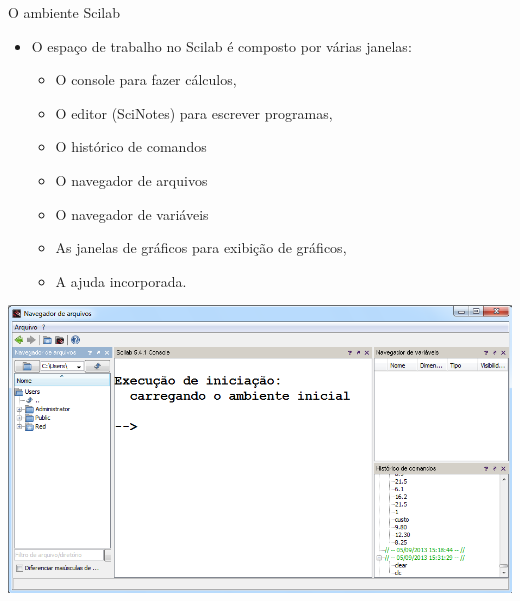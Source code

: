 \begin{frame}[allowframebreaks]{O ambiente Scilab}
  \begin{itemize}
    \item O \alert{espaço de trabalho} no Scilab é composto por várias
    janelas:
    \begin{itemize}
      \item O \alert{console} para fazer cálculos,
      \item O \alert{editor} (\alert{SciNotes}) para escrever programas,
      \item O \alert{histórico de comandos}
      \item O \alert{navegador de arquivos}
      \item O \alert{navegador de variáveis}
      \item As \alert{janelas de gráficos} para exibição de gráficos,
      \item A \alert{ajuda} incorporada.
    \end{itemize}
  \end{itemize}
  \includegraphics[width=\textwidth]{images/ambiente.png}
\end{frame}

